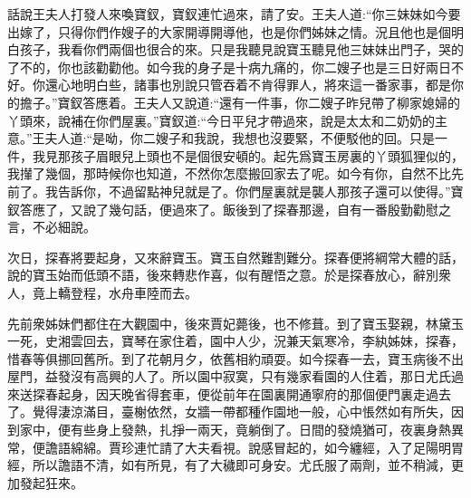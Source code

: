 


\begin{parag}
    話說王夫人打發人來喚寶釵，寶釵連忙過來，請了安。王夫人道:“你三妹妹如今要出嫁了，只得你們作嫂子的大家開導開導他，也是你們姊妹之情。況且他也是個明白孩子，我看你們兩個也很合的來。只是我聽見說寶玉聽見他三妹妹出門子，哭的了不的，你也該勸勸他。如今我的身子是十病九痛的，你二嫂子也是三日好兩日不好。你還心地明白些，諸事也別說只管吞着不肯得罪人，將來這一番家事，都是你的擔子。”寶釵答應着。王夫人又說道:“還有一件事，你二嫂子昨兒帶了柳家媳婦的丫頭來，說補在你們屋裏。”寶釵道:“今日平兒才帶過來，說是太太和二奶奶的主意。”王夫人道:“是呦，你二嫂子和我說，我想也沒要緊，不便駁他的回。只是一件，我見那孩子眉眼兒上頭也不是個很安頓的。起先爲寶玉房裏的丫頭狐狸似的，我攆了幾個，那時候你也知道，不然你怎麼搬回家去了呢。如今有你，自然不比先前了。我告訴你，不過留點神兒就是了。你們屋裏就是襲人那孩子還可以使得。”寶釵答應了，又說了幾句話，便過來了。飯後到了探春那邊，自有一番殷勤勸慰之言，不必細說。
\end{parag}


\begin{parag}
    次日，探春將要起身，又來辭寶玉。寶玉自然難割難分。探春便將綱常大體的話，說的寶玉始而低頭不語，後來轉悲作喜，似有醒悟之意。於是探春放心，辭別衆人，竟上轎登程，水舟車陸而去。
\end{parag}


\begin{parag}
    先前衆姊妹們都住在大觀園中，後來賈妃薨後，也不修葺。到了寶玉娶親，林黛玉一死，史湘雲回去，寶琴在家住着，園中人少，況兼天氣寒冷，李紈姊妹，探春，惜春等俱挪回舊所。到了花朝月夕，依舊相約頑耍。如今探春一去，寶玉病後不出屋門，益發沒有高興的人了。所以園中寂寞，只有幾家看園的人住着，那日尤氏過來送探春起身，因天晚省得套車，便從前年在園裏開通寧府的那個便門裏走過去了。覺得淒涼滿目，臺榭依然，女牆一帶都種作園地一般，心中悵然如有所失，因到家中，便有些身上發熱，扎掙一兩天，竟躺倒了。日間的發燒猶可，夜裏身熱異常，便譫語綿綿。賈珍連忙請了大夫看視。說感冒起的，如今纏經，入了足陽明胃經，所以譫語不清，如有所見，有了大穢即可身安。尤氏服了兩劑，並不稍減，更加發起狂來。
\end{parag}


